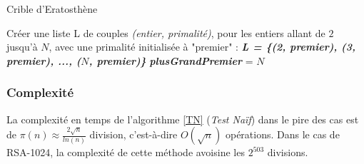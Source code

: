 		\begin{algorithm}[H]
			\caption{Crible d'Eratosthène}\label{Eras}
			{Créer une liste L de couples \textit{(entier, primalité)}, pour les entiers allant de $2$ jusqu'à $N$, avec une primalité initialisée à "premier" : \textit{\textbf{L = \{(2, premier), (3, premier), ..., ($N$, premier)\}}} \;}
			{\textit{\textbf{plusGrandPremier}} = $N$ \;}
		\end{algorithm}	
			
			
		\subsubsection*{Complexité}
			La complexité en temps de l'algorithme \ref{TN} (\textit{Test Naïf}) dans le pire des cas est de $\pi(n) \approx \frac{2\sqrt{n}}{ln(n)}$ division, c'est-à-dire $O(\sqrt{n})$ opérations. Dans le cas de RSA-1024, la complexité de cette méthode avoisine les $2^{503}$ divisions.
			